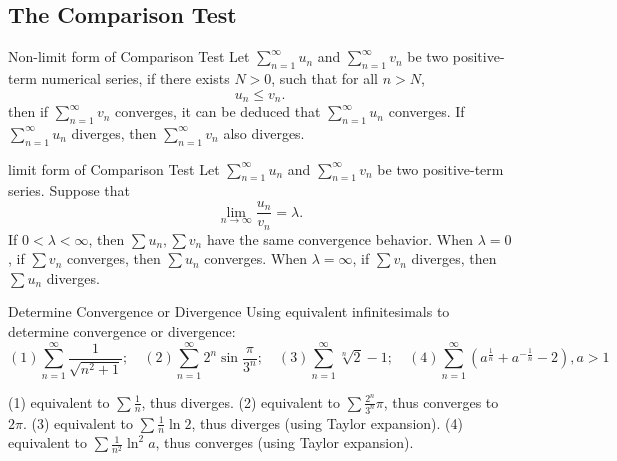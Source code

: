 \subsection{The Comparison Test}

\begin{theorem}{Non-limit form of Comparison Test}{}
  Let $\sum\limits_{n = 1}^{\infty} u_n$ and $\sum\limits_{n = 1}^{\infty}v_n$
  be two positive-term numerical series,
  if there exists $N > 0$, such that for all $n > N$,
  \begin{equation}
    u_n \leq v_n.
  \end{equation}
  then if $\sum\limits_{n = 1}^{\infty} v_n$ converges,
  it can be deduced that $\sum\limits_{n = 1}^{\infty}u_n$ converges.
  If $\sum\limits_{n = 1}^{\infty}u_n$ diverges,
  then $\sum\limits_{n = 1}^{\infty}v_n$ also diverges.
\end{theorem}

\begin{theorem}{limit form of Comparison Test}{}
  Let $\sum\limits_{n = 1}^{\infty} u_n$ and $\sum\limits_{n = 1}^{\infty}v_n$
  be two positive-term series.
  Suppose that
  \begin{equation}
    \lim \limits _{n \rightarrow \infty} \frac{u_n}{v_n} = \lambda.
  \end{equation}
  If $0 < \lambda < \infty$,
  then $\sum u_n, \sum v_n$ have the same convergence behavior.
  When $\lambda = 0$, if $\sum v_n$ converges,
  then $\sum u_n$ converges.
  When $\lambda = \infty$, if $\sum v_n$ diverges,
  then $\sum u_n$ diverges.
\end{theorem}

\begin{example}{Determine Convergence or Divergence}{}
  Using equivalent infinitesimals to determine convergence or divergence:
  \begin{equation}
    (1) \sum\limits_{n = 1}^{\infty} \frac{1}{\sqrt{n^2 + 1}}; \quad
    (2) \sum\limits_{n = 1}^{\infty} 2^n \sin \frac{\pi}{3^n}; \quad
    (3) \sum\limits_{n = 1}^{\infty} \sqrt[n]{2} - 1; \quad
    (4) \sum\limits_{n = 1}^{\infty} (a^{\frac{1}{n}} + a^{- \frac{1}{n}} - 2), a > 1
  \end{equation}
\end{example}

\begin{solution}
  (1) equivalent to $\sum \frac{1}{n}$, thus diverges.
  (2) equivalent to $\sum \frac{2^n}{3^n}\pi$, thus converges to $2\pi$.
  (3) equivalent to $\sum \frac{1}{n} \ln 2$, thus diverges (using Taylor expansion).
  (4) equivalent to $\sum \frac{1}{n^2} \ln^2 a$, thus converges (using Taylor expansion).
\end{solution}

